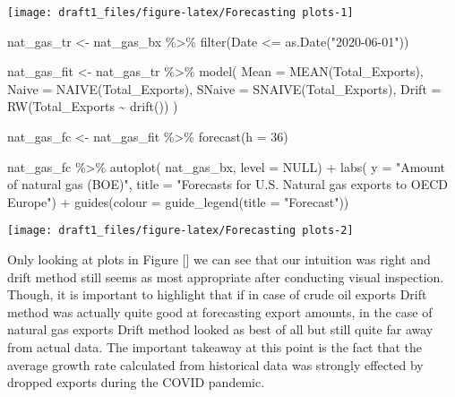 \documentclass[
]{article}
\newenvironment{Shaded}{\begin{snugshade}}{\end{snugshade}}
\newcommand{\AttributeTok}[1]{\textcolor[rgb]{0.77,0.63,0.00}{#1}}
\newcommand{\ConstantTok}[1]{\textcolor[rgb]{0.00,0.00,0.00}{#1}}
\newcommand{\DecValTok}[1]{\textcolor[rgb]{0.00,0.00,0.81}{#1}}
\newcommand{\FunctionTok}[1]{\textcolor[rgb]{0.00,0.00,0.00}{#1}}
\newcommand{\NormalTok}[1]{#1}
\newcommand{\OtherTok}[1]{\textcolor[rgb]{0.56,0.35,0.01}{#1}}
\newcommand{\SpecialCharTok}[1]{\textcolor[rgb]{0.00,0.00,0.00}{#1}}
\newcommand{\StringTok}[1]{\textcolor[rgb]{0.31,0.60,0.02}{#1}}
\begin{document}
\begin{center}\texttt{[image: draft1\_files/figure-latex/Forecasting plots-1]} \end{center}

\begin{Shaded}
\begin{Highlighting}[]
\NormalTok{nat\_gas\_tr }\OtherTok{\textless{}{-}}\NormalTok{ nat\_gas\_bx }\SpecialCharTok{\%\textgreater{}\%} 
  \FunctionTok{filter}\NormalTok{(Date }\SpecialCharTok{\textless{}=} \FunctionTok{as.Date}\NormalTok{(}\StringTok{"2020{-}06{-}01"}\NormalTok{))}


\NormalTok{nat\_gas\_fit }\OtherTok{\textless{}{-}}\NormalTok{ nat\_gas\_tr }\SpecialCharTok{\%\textgreater{}\%} 
  \FunctionTok{model}\NormalTok{(}
    \AttributeTok{Mean =} \FunctionTok{MEAN}\NormalTok{(Total\_Exports),}
    \AttributeTok{Naive =} \FunctionTok{NAIVE}\NormalTok{(Total\_Exports),}
    \AttributeTok{SNaive =} \FunctionTok{SNAIVE}\NormalTok{(Total\_Exports),}
    \AttributeTok{Drift =} \FunctionTok{RW}\NormalTok{(Total\_Exports }\SpecialCharTok{\textasciitilde{}} \FunctionTok{drift}\NormalTok{())}
\NormalTok{  )}

\NormalTok{nat\_gas\_fc }\OtherTok{\textless{}{-}}\NormalTok{ nat\_gas\_fit }\SpecialCharTok{\%\textgreater{}\%} 
  \FunctionTok{forecast}\NormalTok{(}\AttributeTok{h =} \DecValTok{36}\NormalTok{)}

\NormalTok{nat\_gas\_fc }\SpecialCharTok{\%\textgreater{}\%} 
  \FunctionTok{autoplot}\NormalTok{(}
\NormalTok{    nat\_gas\_bx,}
    \AttributeTok{level =} \ConstantTok{NULL}\NormalTok{) }\SpecialCharTok{+}
  \FunctionTok{labs}\NormalTok{(}
    \AttributeTok{y =} \StringTok{"Amount of natural gas (BOE)"}\NormalTok{,}
    \AttributeTok{title =} \StringTok{"Forecasts for U.S. Natural gas exports to OECD Europe"}\NormalTok{) }\SpecialCharTok{+}
  \FunctionTok{guides}\NormalTok{(}\AttributeTok{colour =} \FunctionTok{guide\_legend}\NormalTok{(}\AttributeTok{title =} \StringTok{"Forecast"}\NormalTok{))}
\end{Highlighting}
\end{Shaded}

\begin{center}\texttt{[image: draft1\_files/figure-latex/Forecasting plots-2]} \end{center}

Only looking at plots in Figure {[}{]} we can see that our intuition was
right and drift method still seems as most appropriate after conducting
visual inspection. Though, it is important to highlight that if in case
of crude oil exports Drift method was actually quite good at forecasting
export amounts, in the case of natural gas exports Drift method looked
as best of all but still quite far away from actual data. The important
takeaway at this point is the fact that the average growth rate
calculated from historical data was strongly effected by dropped exports
during the COVID pandemic.
\end{document}
